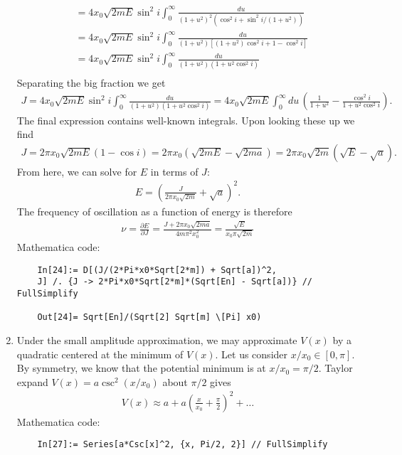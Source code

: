 \documentclass{article}
\theoremstyle{definition}
\newcommand{\p}{\partial}
\newcommand{\f}[2]{\frac{#1}{#2}}
\newcommand{\lp}{\left(}
\newcommand{\rp}{\right)}
\begin{document}
\begin{enumerate}[label=(\alph*)]
\begin{align*}
	&=4x_0 \sqrt{2mE} \sin^2 i \int_0^\infty \f{du}{(1+u^2)^2(\cos^2 i + \sin^2 i /(1+u^2))}\\
	&=4x_0 \sqrt{2mE} \sin^2 i \int_0^\infty \f{du}{(1+u^2)[(1+u^2)\cos^2 i + 1- \cos^2 i]}\\
	&= 4x_0 \sqrt{2mE} \sin^2 i \int_0^\infty \f{du}{(1+u^2)(1+u^2\cos^2 i)}\\
	\end{align*}
	Separating the big fraction we get
	\begin{align*}
	J = 4x_0\sqrt{2mE} \sin^2 i \int_0^\infty \f{du}{(1+u^2)(1+u^2\cos^2i)} = 4x_0\sqrt{2mE} \int_0^\infty du\,\lp \f{1}{1+u^2} - \f{\cos^2 i}{1 + u^2\cos^2 i} \rp.
	\end{align*}
	The final expression contains well-known integrals. Upon looking these up we find 
	\begin{align*}
	J = 2\pi x_0 \sqrt{2mE} (1-\cos i ) = 2\pi x_0 (\sqrt{2mE} - \sqrt{2ma}) = 2\pi x_0 \sqrt{2m} (\sqrt{E} - \sqrt{a}).
	\end{align*}
	From here, we can solve for $E$ in terms of $J$:
	\begin{align*}
	E = \lp \f{J}{2\pi x_0\sqrt{2m}} + \sqrt{a} \rp^2.
	\end{align*}
	The frequency of oscillation as a function of energy is therefore
	\begin{align*}
	\boxed{\nu = \f{\p E}{\p J} = \f{J + 2\pi x_0\sqrt{2ma}}{4m\pi^2 x_0^2} = \f{\sqrt{E}}{x_0 \pi \sqrt{2m}}}
	\end{align*}
	Mathematica code:
	\begin{lstlisting}
	In[24]:= D[(J/(2*Pi*x0*Sqrt[2*m]) + Sqrt[a])^2, 
	J] /. {J -> 2*Pi*x0*Sqrt[2*m]*(Sqrt[En] - Sqrt[a])} // FullSimplify
	
	Out[24]= Sqrt[En]/(Sqrt[2] Sqrt[m] \[Pi] x0)
	\end{lstlisting}
	
	
	
	\item Under the small amplitude approximation, we may approximate $V(x)$ by a quadratic centered at the minimum of $V(x)$. Let us consider $x/x_0 \in [0,\pi]$. By symmetry, we know that the potential minimum is at $x/x_0 = \pi/2$. Taylor expand $V(x) = a\csc^2(x/x_0)$ about $\pi/2$ gives
	\begin{align*}
	V(x)\approx a + a\lp \f{x}{x_0} + \f{\pi}{2} \rp^2 + \dots
	\end{align*}
	Mathematica code:
	\begin{lstlisting}
	In[27]:= Series[a*Csc[x]^2, {x, Pi/2, 2}] // FullSimplify
	

\end{lstlisting}
\end{enumerate}
\end{document}
